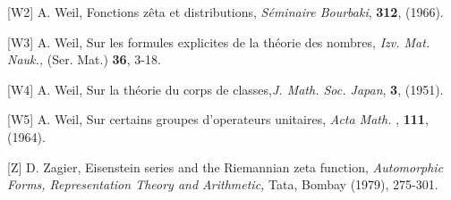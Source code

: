\item{[W2]} A. Weil, Fonctions z\^eta et distributions,
{\it S\'eminaire Bourbaki}, {\bf 312}, (1966).

\item{[W3]} A. Weil, Sur les formules explicites de la
th\'eorie des nombres, {\it Izv. Mat. Nauk.,} (Ser. Mat.)
{\bf 36}, 3-18.
\item{[W4]} A. Weil, Sur la th\'eorie du corps de classes,{\it J. Math. 
Soc. Japan}, {\bf 3}, (1951).

\item{[W5]} A. Weil, Sur certains groupes d'operateurs unitaires,{\it 
Acta Math. }, {\bf 111}, (1964).

\item{[Z]} D. Zagier, Eisenstein series and the Riemannian zeta 
function, {\it Automorphic Forms, Representation Theory and Arithmetic,} 
Tata, Bombay (1979), 275-301.

\bye


